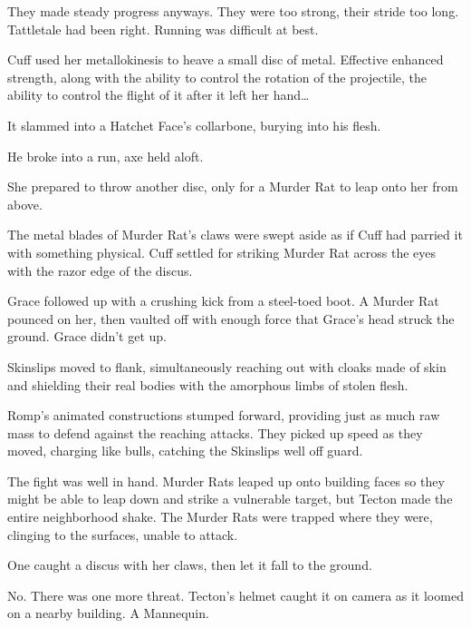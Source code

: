 They made steady progress anyways.  They were too strong, their stride too long.  Tattletale had been right.  Running was difficult at best.



Cuff used her metallokinesis to heave a small disc of metal.  Effective enhanced strength, along with the ability to control the rotation of the projectile, the ability to control the flight of it after it left her hand\ldots



It slammed into a Hatchet Face's collarbone, burying into his flesh.



He broke into a run, axe held aloft.



She prepared to throw another disc, only for a Murder Rat to leap onto her from above.



The metal blades of Murder Rat's claws were swept aside as if Cuff had parried it with something physical.  Cuff settled for striking Murder Rat across the eyes with the razor edge of the discus.



Grace followed up with a crushing kick from a steel-toed boot.  A Murder Rat pounced on her, then vaulted off with enough force that Grace's head struck the ground.  Grace didn't get up.



Skinslips moved to flank, simultaneously reaching out with cloaks made of skin and shielding their real bodies with the amorphous limbs of stolen flesh.



Romp's animated constructions stumped forward, providing just as much raw mass to defend against the reaching attacks.  They picked up speed as they moved, charging like bulls, catching the Skinslips well off guard.



The fight was well in hand.  Murder Rats leaped up onto building faces so they might be able to leap down and strike a vulnerable target, but Tecton made the entire neighborhood shake.  The Murder Rats were trapped where they were, clinging to the surfaces, unable to attack.



One caught a discus with her claws, then let it fall to the ground.



No.  There was one more threat.  Tecton's helmet caught it on camera as it loomed on a nearby building.  A Mannequin.



